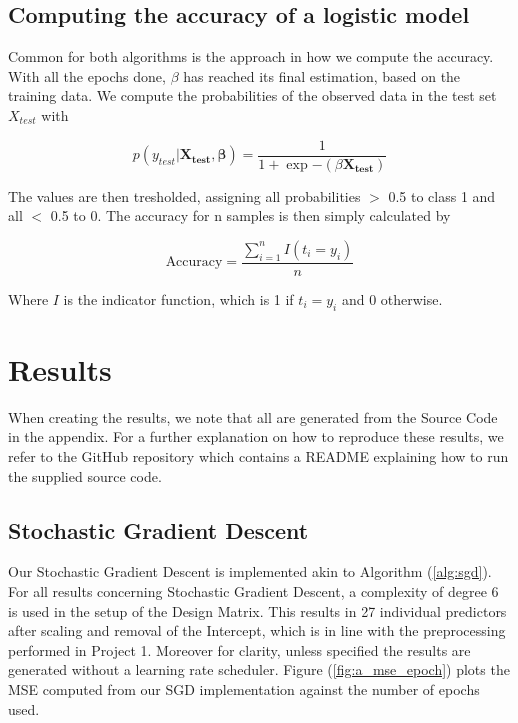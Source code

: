 \documentclass
[twocolumn,
secnumarabic,
nobibnotes,
aps,
prl,
reprint,
groupedaddress,
amsmath,
amssymb
]{revtex4-2}
\begin{document}
\subsection{Computing the accuracy of a logistic model}
Common for both algorithms is the approach in how we compute the accuracy. With all the epochs done, $\beta$ has reached its final estimation, based on the training data. We compute the probabilities of the observed data in the test set $X_{test}$ with

\begin{equation}
  \nonumber
  p(y_{test}|\bm{X_{test}},\bm{\beta}) = \frac{1}{1+\exp{-(\beta \boldsymbol{X_{test}})}}
\end{equation}

The values are then tresholded, assigning all probabilities $>$ 0.5 to class 1 and all $<$ 0.5 to 0. The accuracy for n samples is then simply calculated by

\begin{equation}
  \text{Accuracy} = \frac{\sum_{i=1}^n I(t_i = y_i)}{n}
\end{equation}

Where $I$ is the indicator function, which is 1 if $t_i = y_i$ and 0 otherwise.

\section{Results}
When creating the results, we note that all are generated from the Source Code in the appendix. For a further explanation on how to reproduce these results, we refer to the GitHub repository which contains a README explaining how to run the supplied source code.

\subsection{Stochastic Gradient Descent}
Our Stochastic Gradient Descent is implemented akin to Algorithm (\ref{alg:sgd}). For all results concerning Stochastic Gradient Descent, a complexity of degree 6 is used in the setup of the Design Matrix. This results in 27 individual predictors after scaling and removal of the Intercept, which is in line with the preprocessing performed in Project 1. Moreover for clarity, unless specified the results are generated without a learning rate scheduler.
Figure (\ref{fig:a_mse_epoch}) plots the MSE computed from our SGD implementation against the number of epochs used.
\end{document}

